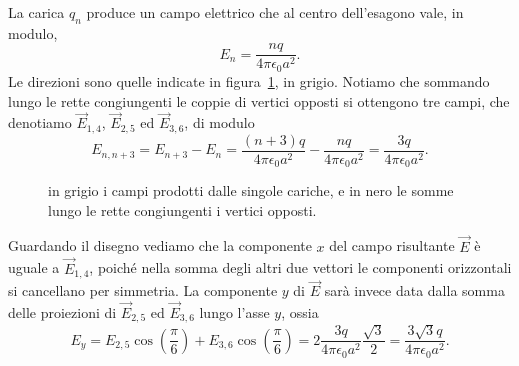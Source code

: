 \documentclass[10pt]{gulartcl}
\newcommand{\hexagon}{%
    \newdimen\side
    \side = 2cm
    \draw[dashed] (0:\side) \foreach \angle in {60, 120, ..., 360}{
        -- (\angle:\side)
    };
    \foreach \i/\pos in
        {1/right, 2/above, 3/above, 4/left, 5/below, 6/below}{
        \node[inner sep=1pt, circle, draw, fill, label={\pos:{$q_{\i}$}}]
            at ({60 * (\i - 1)}:\side) {};
    };}
\begin{document}
\begin{solution}
La carica $q_n$ produce un campo elettrico che al centro dell’esagono vale,
in modulo,
\begin{equation}
    E_n = \frac{n q}{4 \pi \epsilon_0 a^2}.
\end{equation}
Le direzioni sono quelle indicate in figura~\ref{fig:six-vectors}, in
grigio. Notiamo che sommando lungo le rette congiungenti le coppie di
vertici opposti si ottengono tre campi, che denotiamo $\vec{E}_{1, 4}$,
$\vec{E}_{2, 5}$ ed $\vec{E}_{3, 6}$, di modulo
\begin{equation}
    E_{n, n + 3} = E_{n + 3} - E_{n} = \frac{(n + 3) q}{4 \pi \epsilon_0
    a^{2}} - \frac{n q}{4 \pi \epsilon_0 a^{2}} = \frac{3 q}{4 \pi
\epsilon_0 a^2}.
\end{equation}

\begin{figure}
    \centering
    \caption{in grigio i campi prodotti dalle singole cariche, e in nero le
    somme lungo le rette congiungenti i vertici opposti.}
    \label{fig:six-vectors}
\end{figure}

Guardando il disegno vediamo che la componente $x$ del campo risultante
$\vec{E}$ è uguale a $\vec{E}_{1, 4}$, poiché nella somma degli altri due
vettori le componenti orizzontali si cancellano per simmetria.  La
componente $y$ di $\vec{E}$ sarà invece data dalla somma delle proiezioni
di $\vec{E}_{2, 5}$ ed $\vec{E}_{3, 6}$ lungo l’asse $y$, ossia
\begin{equation}
    E_{y} = E_{2, 5} \cos\left(\frac{\pi}{6}\right) + E_{3, 6}
    \cos\left(\frac{\pi}{6}\right) = 2 \frac{3q}{4 \pi \epsilon_0 a^{2}}
    \frac{\sqrt{3}}{2} = \frac{3 \sqrt{3} q}{4 \pi \epsilon_{0} a^{2}}.
\end{equation}


\end{solution}
\end{document}
